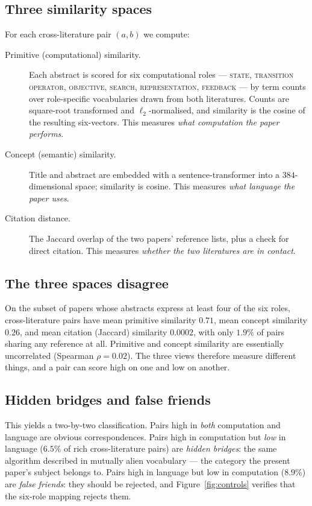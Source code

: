 \documentclass[11pt]{article}
\begin{document}
\subsection{Three similarity spaces}
For each cross-literature pair $(a,b)$ we compute:
\begin{description}
\item[Primitive (computational) similarity.] Each abstract is scored for six computational roles --- \textsc{state},
\textsc{transition operator}, \textsc{objective}, \textsc{search}, \textsc{representation}, \textsc{feedback} ---
by term counts over role-specific vocabularies drawn from both literatures. Counts are square-root transformed and
$\ell_2$-normalised, and similarity is the cosine of the resulting six-vectors. This measures \emph{what computation
the paper performs}.
\item[Concept (semantic) similarity.] Title and abstract are embedded with a sentence-transformer into a $384$-
dimensional space; similarity is cosine. This measures \emph{what language the paper uses}.
\item[Citation distance.] The Jaccard overlap of the two papers' reference lists, plus a check for direct citation.
This measures \emph{whether the two literatures are in contact}.
\end{description}

\subsection{The three spaces disagree}
On the subset of papers whose abstracts express at least four of the six roles, cross-literature pairs have mean
primitive similarity $0.71$, mean concept similarity $0.26$, and mean citation (Jaccard) similarity $0.0002$, with
only $1.9\%$ of pairs sharing any reference at all. Primitive and concept similarity are essentially uncorrelated
(Spearman $\rho=0.02$). The three views therefore measure different things, and a pair can score high on one and low
on another.

\subsection{Hidden bridges and false friends}
This yields a two-by-two classification. Pairs high in \emph{both} computation and language are obvious
correspondences. Pairs high in computation but \emph{low} in language ($6.5\%$ of rich cross-literature pairs) are
\emph{hidden bridges}: the same algorithm described in mutually alien vocabulary --- the category the present paper's
subject belongs to. Pairs high in language but low in computation ($8.9\%$) are \emph{false friends}: they should be
rejected, and Figure~\ref{fig:controls} verifies that the six-role mapping rejects them.
\end{document}
